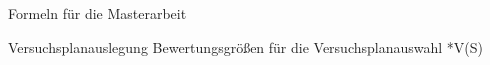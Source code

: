 Formeln für die Masterarbeit

Versuchsplanauslegung
	Bewertungsgrößen für die Versuchsplanauswahl
	*V(S)
	